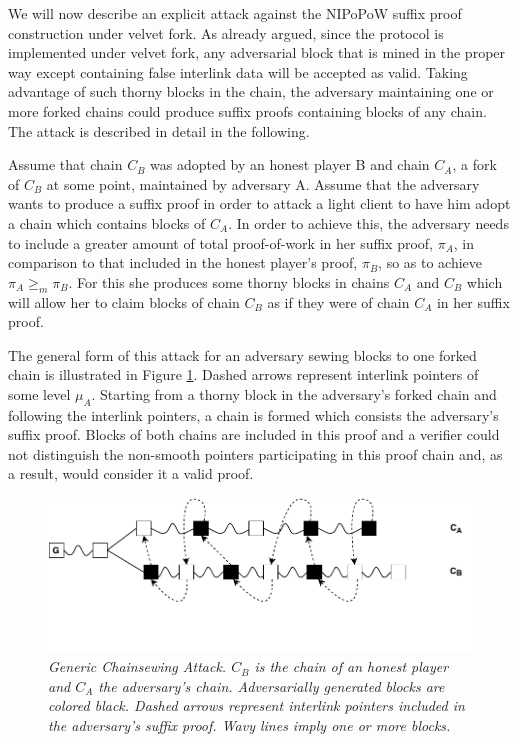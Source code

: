 We  will now describe an explicit attack against the NIPoPoW suffix proof construction 
under velvet fork. As already argued, since the protocol is implemented under
velvet fork, any adversarial block that is mined in the proper way except
containing false interlink data will be accepted as valid. Taking advantage 
of such thorny blocks in the chain, the adversary maintaining one or more forked 
chains could produce suffix proofs containing blocks of any chain.
The attack is described in detail in the following.

Assume that chain $C_B$ was adopted by an honest player B and chain $C_A$, 
a fork of $C_B$ at some point, maintained by adversary A. Assume that the
adversary wants to produce a suffix  proof in order to attack a light client 
to have him adopt a chain which contains blocks of $C_A$. In order to achieve
this, the adversary needs to include a greater amount of total proof-of-work
in her suffix proof, $\pi_A$, in comparison to that included in the honest
player's proof, $\pi_B$, so as to achieve $\pi_A \geq_m \pi_B$. For this she
produces some thorny blocks in chains $C_A$ and $C_B$ which will allow her to
claim blocks of chain $C_B$ as if they were of chain $C_A$ in her suffix proof.

The general form of this attack for an adversary sewing blocks to one forked
chain is illustrated in Figure \ref{fig:generic_attack}. Dashed arrows
represent interlink pointers of some level $\mu_A$. Starting from a thorny
block in the adversary's forked chain and following the interlink pointers,
a chain is formed which consists the adversary's suffix proof. Blocks of 
both chains are included in this proof and a verifier could not distinguish 
the non-smooth pointers participating in this proof chain and, as a result,
would consider it a valid proof.

\begin{figure}[h]
	\begin{center}
		\includegraphics[scale=0.75]{figures/generic_chainsewing_attack.pdf}
	\end{center}
	\caption{\textit{Generic Chainsewing Attack. $C_B$ is the chain of an honest
	player and $C_A$ the adversary's chain. Adversarially generated blocks are
	colored black. Dashed arrows represent interlink pointers included in the 
	adversary's suffix proof. Wavy lines imply one or more blocks.}}
	\label{fig:generic_attack}
\end{figure}

